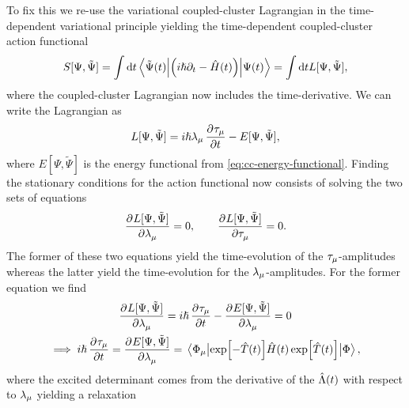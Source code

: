         To fix this we re-use the variational coupled-cluster Lagrangian in the
        time-dependent variational principle yielding the time-dependent
        coupled-cluster action functional \cite{kvaal2013variational}
        \begin{align}
            S[\Psi, \tilde{\Psi}]
            = \int\dd t
            \mel{\tilde{\Psi}(t)}{
                \left( 
                    i\hslash\partial_t
                    - \hat{H}(t)
                 \right)
            }{\Psi(t)}
            = \int\dd t
            L[\Psi, \tilde{\Psi}],
        \end{align}
        where the coupled-cluster Lagrangian now includes the time-derivative.
        We can write the Lagrangian as
        \begin{align}
            L[\Psi, \tilde{\Psi}]
            = i\hslash \clustlamp_{\mu}\dpd{\clustamp_{\mu}}{t}
            - E[\Psi, \tilde{\Psi}],
        \end{align}
        where $E[\Psi, \tilde{\Psi}]$ is the energy functional from
        \autoref{eq:cc-energy-functional}.
        Finding the stationary conditions for the action functional now consists
        of solving the two sets of equations
        \begin{align}
            \dpd{L[\Psi, \tilde{\Psi}]}{\clustlamp_{\mu}} = 0,
            \qquad
            \dpd{L[\Psi, \tilde{\Psi}]}{\clustamp_{\mu}} = 0.
        \end{align}
        The former of these two equations yield the time-evolution of the
        $\tau_{\mu}$-amplitudes whereas the latter yield the
        time-evolution for the $\lambda_{\mu}$-amplitudes.
        For the former equation we find
        \begin{gather}
            \dpd{L[\Psi, \tilde{\Psi}]}{\clustlamp_{\mu}}
            =
            i\hslash\dpd{\clustamp_{\mu}}{t}
            - \dpd{E[\Psi, \tilde{\Psi}]}{\clustlamp_{\mu}}
            = 0
            \\
            \implies
            i\hslash\dpd{\clustamp_{\mu}}{t}
            =
            \dpd{E[\Psi, \tilde{\Psi}]}{\clustlamp_{\mu}}
            =
            \mel{\slat_{\mu}}{
                \exp[-\clust(t)]
                \hamil(t)
                \exp[\clust(t)]
            }{\slat},
            \label{eq:time-evolution-tau}
        \end{gather}
        where the excited determinant comes from the derivative of the
        $\hat{\Lambda}(t)$ with respect to $\lambda_{\mu}$ yielding a relaxation
